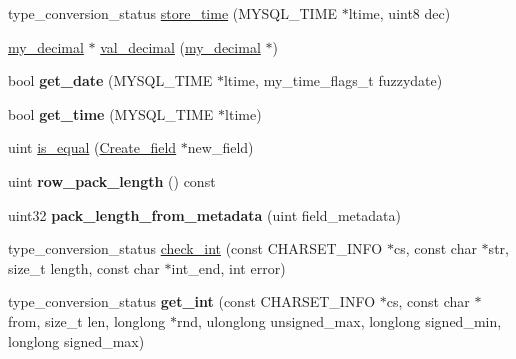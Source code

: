 \begin{DoxyCompactItemize}
\item 
type\+\_\+conversion\+\_\+status \mbox{\hyperlink{classField__num_ab573b6e30982c3d517794503f14560de}{store\+\_\+time}} (M\+Y\+S\+Q\+L\+\_\+\+T\+I\+ME $\ast$ltime, uint8 dec)
\item 
\mbox{\hyperlink{classmy__decimal}{my\+\_\+decimal}} $\ast$ \mbox{\hyperlink{classField__num_a6fec8b8c9fc5c0b9b0429f6fbc860de3}{val\+\_\+decimal}} (\mbox{\hyperlink{classmy__decimal}{my\+\_\+decimal}} $\ast$)
\item 
\mbox{\label{classField__num_a8f2c093f912b5794c761f3bc00985498}} 
bool {\bfseries get\+\_\+date} (M\+Y\+S\+Q\+L\+\_\+\+T\+I\+ME $\ast$ltime, my\+\_\+time\+\_\+flags\+\_\+t fuzzydate)
\item 
\mbox{\label{classField__num_ac5f1b7cf4e7d58501734efddfec9af08}} 
bool {\bfseries get\+\_\+time} (M\+Y\+S\+Q\+L\+\_\+\+T\+I\+ME $\ast$ltime)
\item 
uint \mbox{\hyperlink{classField__num_af9c9a23de2d14eceaeb96f1f98212ed4}{is\+\_\+equal}} (\mbox{\hyperlink{classCreate__field}{Create\+\_\+field}} $\ast$new\+\_\+field)
\item 
\mbox{\label{classField__num_aff7cbda7dd6dfbd368b87ccc43dce34e}} 
uint {\bfseries row\+\_\+pack\+\_\+length} () const
\item 
\mbox{\label{classField__num_a982db87fb12ffc1860801af81072405c}} 
uint32 {\bfseries pack\+\_\+length\+\_\+from\+\_\+metadata} (uint field\+\_\+metadata)
\item 
type\+\_\+conversion\+\_\+status \mbox{\hyperlink{classField__num_a6497614b428534475736dc71902096fd}{check\+\_\+int}} (const C\+H\+A\+R\+S\+E\+T\+\_\+\+I\+N\+FO $\ast$cs, const char $\ast$str, size\+\_\+t length, const char $\ast$int\+\_\+end, int error)
\item 
\mbox{\label{classField__num_ab2960a68df9af5fccbcf842640e2e966}} 
type\+\_\+conversion\+\_\+status {\bfseries get\+\_\+int} (const C\+H\+A\+R\+S\+E\+T\+\_\+\+I\+N\+FO $\ast$cs, const char $\ast$from, size\+\_\+t len, longlong $\ast$rnd, ulonglong unsigned\+\_\+max, longlong signed\+\_\+min, longlong signed\+\_\+max)
\end{DoxyCompactItemize}
